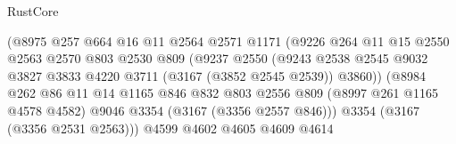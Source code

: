 \begin{lexlean}{RustCore}
\begin{coremodule}
                                      (@8975
                                        @257
                                        @664
                                        @16
                                        @11
                                        @2564
                                        @2571
                                        @1171
                                        (@9226
                                          @264
                                          @11
                                          @15
                                          @2550
                                          @2563
                                          @2570
                                          @803
                                          @2530
                                          @809
                                          (@9237
                                            @2550
                                            (@9243
                                              @2538
                                              @2545
                                              @9032
                                              @3827
                                              @3833
                                              @4220
                                              @3711
                                              (@3167 (@3852 @2545 @2539))
                                              @3860))
                                          (@8984
                                            @262
                                            @86
                                            @11
                                            @14
                                            @1165
                                            @846
                                            @832
                                            @803
                                            @2556
                                            @809
                                            (@8997 @261 @1165 @4578 @4582)
                                            @9046
                                            @3354
                                            (@3167 (@3356 @2557 @846)))
                                          @3354
                                          (@3167 (@3356 @2531 @2563)))
                                        @4599
                                        @4602
                                        @4605
                                        @4609
                                        @4614

\end{coremodule}
\end{lexlean}
